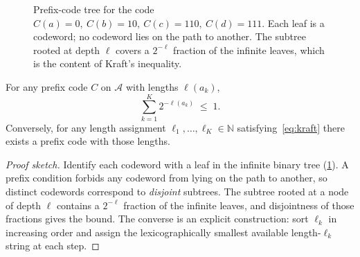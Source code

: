 \begin{figure}[h]
\centering
{}
\caption{Prefix-code tree for the code $C(a)=0,\ C(b)=10,\
C(c)=110,\ C(d)=111$. Each leaf is a codeword; no codeword lies on
the path to another. The subtree rooted at depth $\ell$ covers a
$2^{-\ell}$ fraction of the infinite leaves, which is the content of
Kraft's inequality.}
\label{fig:prefix-tree}
\end{figure}

\begin{lemma}
\label{lem:kraft}
For any prefix code $C$ on $\mathcal{A}$ with lengths $\ell(a_k)$,
\begin{equation}
  \sum_{k=1}^{K} 2^{-\ell(a_k)} \;\le\; 1.
  \label{eq:kraft}
\end{equation}
Conversely, for any length assignment $\ell_1, \dots, \ell_K \in
\mathbb{N}$ satisfying~\eqref{eq:kraft} there exists a prefix code
with those lengths.
\end{lemma}

\begin{proof}[Proof sketch]
Identify each codeword with a leaf in the infinite binary tree
(\cref{fig:prefix-tree}). A prefix condition forbids any codeword
from lying on the path to another, so distinct codewords correspond
to \emph{disjoint} subtrees. The subtree rooted at a node of depth
$\ell$ contains a $2^{-\ell}$ fraction of the infinite leaves, and
disjointness of those fractions gives the bound. The converse is an
explicit construction: sort $\ell_k$ in increasing order and assign
the lexicographically smallest available length-$\ell_k$ string at
each step.
\end{proof}


